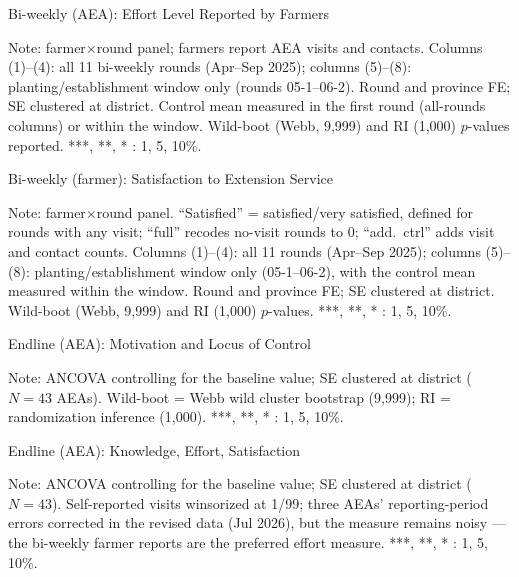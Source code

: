 \documentclass[aspectratio=169]{beamer}
\begin{document}
\begin{frame}{Bi-weekly (AEA): Effort Level Reported by Farmers}
	\centering
	\scalebox{0.5}{}
	\begin{tablenotes}
		\scriptsize
		\item Note: farmer$\times$round panel; farmers report AEA visits and contacts. Columns (1)--(4):
		all 11 bi-weekly rounds (Apr--Sep 2025); columns (5)--(8): planting/establishment window only
		(rounds 05-1--06-2). Round and province FE; SE clustered at district. Control mean measured in
		the first round (all-rounds columns) or within the window. Wild-boot (Webb, 9{,}999) and RI
		(1{,}000) $p$-values reported. ***, **, * : 1, 5, 10\%.
	\end{tablenotes}
\end{frame}

\begin{frame}{Bi-weekly (farmer): Satisfaction to Extension Service}
	\centering
	\scalebox{0.46}{}
	\begin{tablenotes}
		\scriptsize
		\item Note: farmer$\times$round panel. ``Satisfied'' = satisfied/very satisfied, defined for
		rounds with any visit; ``full'' recodes no-visit rounds to 0; ``add.\ ctrl'' adds visit and
		contact counts. Columns (1)--(4): all 11 rounds (Apr--Sep 2025); columns (5)--(8):
		planting/establishment window only (05-1--06-2), with the control mean measured within the
		window. Round and province FE; SE clustered at district. Wild-boot (Webb, 9{,}999) and RI
		(1{,}000) $p$-values. ***, **, * : 1, 5, 10\%.
	\end{tablenotes}
\end{frame}

\begin{frame}{Endline (AEA): Motivation and Locus of Control}
	\centering
	\scalebox{0.55}{}
	\begin{tablenotes}
		\scriptsize
		\item Note: ANCOVA controlling for the baseline value; SE clustered at district ($N=43$ AEAs).
		Wild-boot = Webb wild cluster bootstrap (9{,}999); RI = randomization inference (1{,}000).
		***, **, * : 1, 5, 10\%.
	\end{tablenotes}
\end{frame}

\begin{frame}{Endline (AEA): Knowledge, Effort, Satisfaction}
	\centering
	\scalebox{0.58}{}
	\begin{tablenotes}
		\scriptsize
		\item Note: ANCOVA controlling for the baseline value; SE clustered at district ($N=43$).
		Self-reported visits winsorized at 1/99; three AEAs' reporting-period errors corrected in the
		revised data (Jul 2026), but the measure remains noisy --- the bi-weekly farmer reports are
		the preferred effort measure.
		***, **, * : 1, 5, 10\%.
	\end{tablenotes}
\end{frame}
\end{document}
